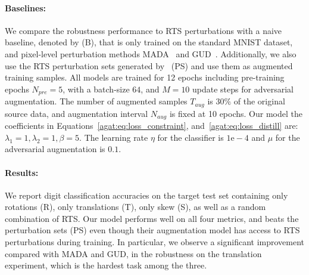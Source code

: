     \paragraph{Baselines:}
    We compare the robustness performance to RTS perturbations with a naive baseline, denoted by (B), that is only trained on the standard MNIST dataset, and pixel-level perturbation methods MADA~\citep{qiao2020learning} and GUD~\citep{volpi2018generalizing}.
    Additionally, we also use the RTS perturbation sets generated by~\citep{wong2020learning} (PS) and use them as augmented training samples. 
    All models are trained for 12 epochs including pre-training epochs $N_{pre}=5$, with a batch-size $64$, and $M=10$ update steps for adversarial augmentation. The number of augmented samples $T_{aug}$ is $30\%$ of the original source data, and augmentation interval $N_{aug}$ is fixed at 10 epochs.
    Our model the coefficients in Equations~\ref{agat:eq:loss_constraint}, and~\ref{agat:eq:loss_distill} are: $\lambda_1=1, \lambda_2=1, \beta=5$.
    The learning rate $\eta$ for the classifier is $1\mathrm{e-}4$ and $\mu$ for the adversarial augmentation is $0.1$.


    \paragraph{Results:}

    
    We report digit classification accuracies on the target test set containing only rotations (R), only translations (T), only skew (S), as well as a random combination of RTS. Our model performs well on all four metrics, and beats the perturbation sets (PS) even though their augmentation model has access to RTS perturbations during training. In particular, we observe a significant improvement compared with MADA and GUD, in the robustness on the translation experiment, which is the hardest task among the three. 

